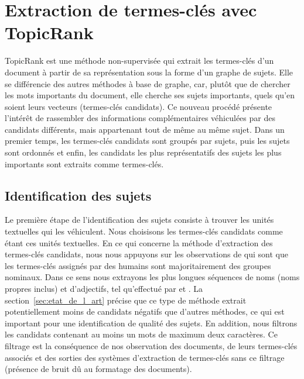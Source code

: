 \section{Extraction de termes-clés avec TopicRank}
\label{sec:extraction_de_termes_cles_avec_topicrank}
  TopicRank est une méthode non-supervisée qui extrait les termes-clés d'un
  document à partir de sa représentation sous la forme d'un graphe de sujets.
  Elle se différencie des autres méthodes à base de graphe, car, plutôt que de
  chercher les mots importants du document, elle cherche ses sujets importants,
  quels qu'en soient leurs vecteurs (termes-clés candidats). Ce nouveau procédé
  présente l'intérêt de rassembler des informations complémentaires véhiculées
  par des candidats différents, mais appartenant tout de même au même sujet.
  Dans un premier temps, les termes-clés candidats sont groupés par sujets, puis
  les sujets sont ordonnés et enfin, les candidats les plus représentatifs des
  sujets les plus importants sont extraits comme termes-clés.

  \subsection{Identification des sujets}
  \label{subsec:identification_des_sujets}
    Le première étape de l'identification des sujets consiste à trouver les
    unités textuelles qui les véhiculent. Nous choisisons les termes-clés
    candidats comme étant ces unités textuelles.
    En ce qui concerne la méthode d'extraction des termes-clés candidats, nous
    nous appuyons sur les observations de 
    qui sont que les termes-clés assignés par des humains sont majoritairement
    des groupes nominaux. Dans ce sens nous extrayons les plus longues séquences
    de noms (noms propres inclus) et d'adjectifs, tel qu'effectué par
     et . La
    section~\ref{sec:etat_de_l_art} précise que ce type de méthode extrait
    potentiellement moins de candidats négatifs que d'autres méthodes, ce qui
    est important pour une identification de qualité des sujets. En addition,
    nous filtrons les candidats contenant au moins un mots de maximum deux
    caractères. Ce filtrage est la conséquence de nos observation des documents,
    de leurs termes-clés associés et des sorties des systèmes d'extraction de
    termes-clés sans ce filtrage (présence de bruit dû au formatage des
    documents).

